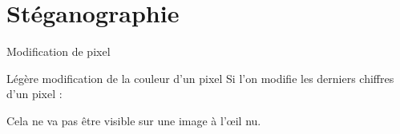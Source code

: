 \documentclass{beamer}
\begin{document}
    \section{Stéganographie}

    \begin{frame}{Modification de pixel}%

        \begin{block}{Légère modification de la couleur d'un pixel}
            Si l'on modifie les derniers chiffres d'un pixel :
            \begin{center}%
            \end{center}%

            Cela ne va pas être visible sur une image à l'\oe il nu.
        \end{block}
    \end{frame}%
\end{document}
